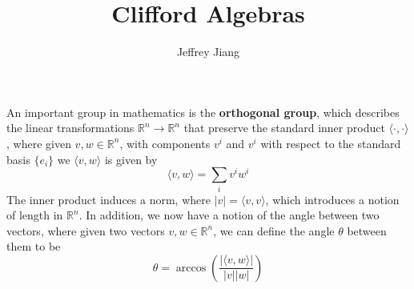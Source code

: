 \documentclass{article}
\newcommand{\R}{\mathbb{R}}
\begin{document}
\title{Clifford Algebras}
\author{Jeffrey Jiang}
\date{}
\maketitle
%
An important group in mathematics is the \textbf{orthogonal group}, which describes the linear transformations $\R^n \to \R^n$ that preserve the standard inner product $\langle \cdot, \cdot \rangle$, where given $v,w \in \R^n$, with components $v^i$ and $v^i$ with respect to the standard basis $\{e_i\}$ we $\langle v,w \rangle$ is given by
$$\langle v,w \rangle  = \sum_i v^iw^i $$
The inner product induces a norm, where $|v| = \langle v,v \rangle$, which introduces a notion of length in $\R^n$. In addition, we now have a notion of the angle between two vectors, where given two vectors $v,w \in \R^n$, we can define the angle $\theta$ between them to be
$$\theta = \arccos\left( \frac{|\langle v,w \rangle|}{|v| |w|} \right) $$
\end{document}
